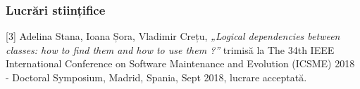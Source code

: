 \documentclass{beamer}
\begin{document}

 \begin{frame}
\frametitle{Lucrări stiințifice}

[3] Adelina Stana, Ioana Șora, Vladimir Crețu, \textit{„Logical dependencies between classes: how to find them and how to use them ?”} trimisă la The 34th IEEE International Conference on Software Maintenance and Evolution (ICSME) 2018 - Doctoral Symposium, Madrid, Spania, Sept 2018, lucrare acceptată.
\end{frame}



\end{document}
